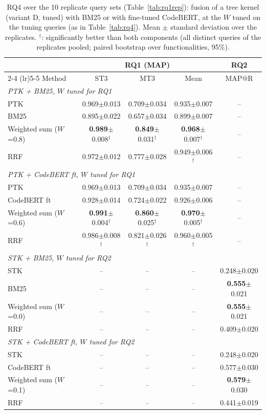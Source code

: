 \begin{table}[t]
\centering
\caption{RQ4 over the 10 replicate query sets (Table~\ref{tab:rq1rep}): fusion of a tree kernel (variant D, tuned) with BM25 or with fine-tuned CodeBERT, at the $W$ tuned on the tuning queries (as in Table~\ref{tab:rq4}). Mean $\pm$ standard deviation over the replicates. $^{\dagger}$: significantly better than both components (all distinct queries of the replicates pooled; paired bootstrap over functionalities, 95\%).}
\label{tab:rq4rep}
\footnotesize
\setlength{\tabcolsep}{4pt}
\begin{tabular}{lcccc}
\toprule
 & \multicolumn{3}{c}{RQ1 (MAP)} & RQ2 \\ \cmidrule(lr){2-4} \cmidrule(lr){5-5}
Method & ST3 & MT3 & Mean & MAP@R \\
\midrule
\multicolumn{5}{l}{\emph{PTK + BM25, $W$ tuned for RQ1}} \\
\quad PTK & 0.969$\pm$0.013 & 0.709$\pm$0.034 & 0.935$\pm$0.007 & -- \\
\quad BM25 & 0.895$\pm$0.022 & 0.657$\pm$0.034 & 0.899$\pm$0.007 & -- \\
\quad Weighted sum ($W$=0.8) & \textbf{0.989}$\pm$0.008$^{\dagger}$ & \textbf{0.849}$\pm$0.031$^{\dagger}$ & \textbf{0.968}$\pm$0.007$^{\dagger}$ & -- \\
\quad RRF & 0.972$\pm$0.012 & 0.777$\pm$0.028 & 0.949$\pm$0.006$^{\dagger}$ & -- \\
\midrule
\multicolumn{5}{l}{\emph{PTK + CodeBERT ft, $W$ tuned for RQ1}} \\
\quad PTK & 0.969$\pm$0.013 & 0.709$\pm$0.034 & 0.935$\pm$0.007 & -- \\
\quad CodeBERT ft & 0.928$\pm$0.014 & 0.724$\pm$0.022 & 0.926$\pm$0.006 & -- \\
\quad Weighted sum ($W$=0.6) & \textbf{0.991}$\pm$0.004$^{\dagger}$ & \textbf{0.860}$\pm$0.025$^{\dagger}$ & \textbf{0.970}$\pm$0.005$^{\dagger}$ & -- \\
\quad RRF & 0.986$\pm$0.008$^{\dagger}$ & 0.821$\pm$0.026$^{\dagger}$ & 0.960$\pm$0.005$^{\dagger}$ & -- \\
\midrule
\multicolumn{5}{l}{\emph{STK + BM25, $W$ tuned for RQ2}} \\
\quad STK & -- & -- & -- & 0.248$\pm$0.020 \\
\quad BM25 & -- & -- & -- & \textbf{0.555}$\pm$0.021 \\
\quad Weighted sum ($W$=0.0) & -- & -- & -- & \textbf{0.555}$\pm$0.021 \\
\quad RRF & -- & -- & -- & 0.409$\pm$0.020 \\
\midrule
\multicolumn{5}{l}{\emph{STK + CodeBERT ft, $W$ tuned for RQ2}} \\
\quad STK & -- & -- & -- & 0.248$\pm$0.020 \\
\quad CodeBERT ft & -- & -- & -- & 0.577$\pm$0.030 \\
\quad Weighted sum ($W$=0.1) & -- & -- & -- & \textbf{0.579}$\pm$0.030 \\
\quad RRF & -- & -- & -- & 0.441$\pm$0.019 \\
\bottomrule
\end{tabular}
\end{table}
